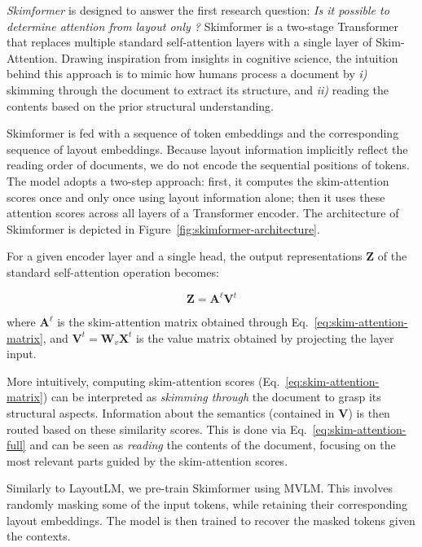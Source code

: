 \emph{Skimformer} is designed to answer the first research question: \textit{Is it possible to determine attention from layout only ?} Skimformer is a two-stage Transformer that replaces multiple standard self-attention layers with a single layer of Skim-Attention. Drawing inspiration from insights in cognitive science, the intuition behind this approach is to mimic how humans process a document by \emph{i)} skimming through the document to extract its structure, and \emph{ii)}  reading the contents based on the prior structural understanding. 

Skimformer is fed with a sequence of token embeddings and the corresponding sequence of layout embeddings. Because layout information implicitly reflect the reading order of documents, we do not encode the sequential positions of tokens. The model adopts a two-step approach: first, it computes the skim-attention scores once and only once using layout information alone; then it uses these attention scores across all layers of a Transformer encoder. The architecture of Skimformer is depicted in Figure~\ref{fig:skimformer-architecture}.

For a given encoder layer and a single head, the output representations $\bm{Z}$ of the standard self-attention operation becomes:

\begin{equation}
\label{eq:skim-attention-full}
	\bm{Z} = \bm{A}^{\ell} \bm{V}^{t}
\end{equation}

\noindent where $\bm{A}^{\ell}$ is the skim-attention matrix obtained through Eq.~\ref{eq:skim-attention-matrix}, and $\bm{V}^{t} = \bm{W}_{v} \bm{X}^t$ is the value matrix obtained by projecting the layer input.

More intuitively, computing skim-attention scores (Eq.~\ref{eq:skim-attention-matrix}) can be interpreted as \textit{skimming through} the document to grasp its structural aspects. Information about the semantics (contained in $\bm{V}$) is then routed based on these similarity scores. This is done via Eq.~\ref{eq:skim-attention-full} and can be seen as \textit{reading} the contents of the document, focusing on the most relevant parts guided by the skim-attention scores.

Similarly to LayoutLM, we pre-train Skimformer using \ac{MVLM}. This involves randomly masking some of the input tokens, while retaining their corresponding layout embeddings. The model is then trained to recover the masked tokens given the contexts. 

